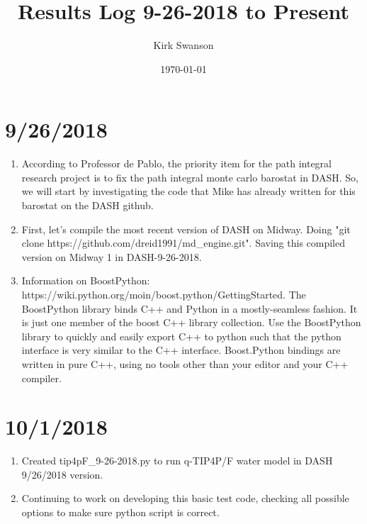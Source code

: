 \documentclass[12pt,reqno]{amsart}
\numberwithin{equation}{section}
\begin{document}
\title{Results Log 9-26-2018 to Present}
\author{Kirk Swanson}
\address{Institute for Molecular Engineering, University of Chicago, 5640 S Ellis Ave, Chicago, IL 60637}
\date{\today}

\maketitle

\section{9/26/2018}
\begin{enumerate}
\item According to Professor de Pablo, the priority item for the path integral research project is to fix the path integral monte carlo barostat in DASH.  So, we will start by investigating the code that Mike has already written for this barostat on the DASH github.
\item First, let's compile the most recent version of DASH on Midway.  Doing "git clone https://github.com/dreid1991/md\_engine.git".  Saving this compiled version on Midway 1 in DASH-9-26-2018.  
\item Information on BoostPython: https://wiki.python.org/moin/boost.python/GettingStarted.  
\subitem The BoostPython library binds C++ and Python in a mostly-seamless fashion.  It is just one member of the boost C++ library collection.  Use the BoostPython library to quickly and easily export C++ to python such that the python interface is very similar to the C++ interface.  Boost.Python bindings are written in pure C++, using no tools other than your editor and your C++ compiler.  
\end{enumerate}

\section{10/1/2018}
\begin{enumerate}
\item Created tip4pF\_9-26-2018.py to run q-TIP4P/F water model in DASH 9/26/2018 version.  
\item Continuing to work on developing this basic test code, checking all possible options to make sure python script is correct.  
\end{enumerate}
\end{document}
